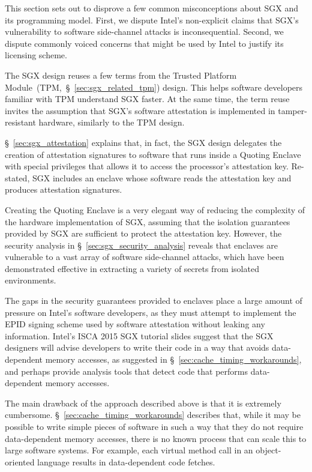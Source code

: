 \label{sec:sgx_misconceptions}

This section sets out to disprove a few common misconceptions about SGX and its
programming model. First, we dispute Intel's non-explicit claims that SGX's
vulnerability to software side-channel attacks is inconsequential. Second, we
dispute commonly voiced concerns that might be used by Intel to justify its
licensing scheme.



The SGX design reuses a few terms from the Trusted Platform
Module~(TPM,~\S~\ref{sec:sgx_related_tpm}) design. This helps software
developers familiar with TPM understand SGX faster. At the same time, the term
reuse invites the assumption that SGX's software attestation is implemented in
tamper-resistant hardware, similarly to the TPM design.

\S~\ref{sec:sgx_attestation} explains that, in fact, the SGX design delegates
the creation of attestation signatures to software that runs inside a
Quoting Enclave with special privileges that allows it to access the
processor's attestation key. Re-stated, SGX includes an enclave whose
software reads the attestation key and produces attestation signatures.

Creating the Quoting Enclave is a very elegant way of reducing the complexity
of the hardware implementation of SGX, assuming that the isolation guarantees
provided by SGX are sufficient to protect the attestation key. However, the
security analysis in \S~\ref{sec:sgx_security_analysis} reveals that enclaves
are vulnerable to a vast array of software side-channel attacks, which have
been demonstrated effective in extracting a variety of secrets from isolated
environments.


The gaps in the security guarantees provided to enclaves place a large amount
of pressure on Intel's software developers, as they must attempt to implement
the EPID signing scheme used by software attestation without leaking any
information. Intel's ISCA 2015 SGX tutorial slides suggest that the SGX
designers will advise developers to write their code in a way that avoids
data-dependent memory accesses, as suggested in
\S~\ref{sec:cache_timing_workarounds}, and perhaps provide analysis tools that
detect code that performs data-dependent memory accesses.

The main drawback of the approach described above is that it is extremely
cumbersome. \S~\ref{sec:cache_timing_workarounds} describes that, while it may
be possible to write simple pieces of software in such a way that they do not
require data-dependent memory accesses, there is no known process that can
scale this to large software systems. For example, each virtual method call in
an object-oriented language results in data-dependent code fetches.

